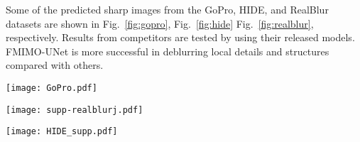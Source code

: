 \documentclass[letterpaper]{article} \usepackage{aaai23}  \usepackage{times}  \usepackage{helvet}  \usepackage{courier}  \usepackage[hyphens]{url}  \usepackage{graphicx} \usepackage{enumitem}
\begin{document}
Some of the predicted sharp images from the GoPro, HIDE, and RealBlur datasets are shown in Fig.~\ref{fig:gopro}, Fig.~\ref{fig:hide} Fig.~\ref{fig:realblur}, respectively. Results from competitors are tested by using their released models. FMIMO-UNet is more successful in deblurring local details and structures compared with others.


\begin{figure*}[h]
\begin{center}
    \texttt{[image: GoPro.pdf]}
\end{center}
\caption{Examples on the GoPro test dataset. The original blur image and the zoom-in patches are shown. From left-top to right-bottom are blurry image, results obtained through, MIMO-UNet+ \cite{Cho2021rethinking}, HINet \cite{Chen2021hinet}, MPRNet \cite{Zamir2021multi}, Restormer \cite{Zamir2021restormer}, FMIMO-UNet, FMIMO-UNet+, and the groundtruth sharp image.} 
\label{fig:gopro}
\vspace{-0.8em}
\end{figure*}

\begin{figure*}[h]
\begin{center}
    \texttt{[image: supp-realblurj.pdf]}
\end{center}
\caption{Examples on RealBlur datasets. The original blur image and the zoom-in patches are shown. From left to right are blurry image, results obtained through DeblurGAN-v2 \cite{Kupyn2019deblurgan}, SRN \cite{Tao2018scale}, FMIMO-UNet+ and the groundtruth sharp image.} 
\label{fig:realblur}
\end{figure*}

\begin{figure*}[h]
\begin{center}
    \texttt{[image: HIDE\_supp.pdf]}
\end{center}
\caption{Examples on HIDE datasets. The original blur image and the zoom-in patches are shown. From left-top to right-bottom are blurry image, results obtained through MIMO-UNet+ \cite{Cho2021rethinking}, HINet \cite{Chen2021hinet}, MPRNet \cite{Zamir2021multi}, Restormer \cite{Zamir2021restormer}, FMIMO-UNet, FMIMO-UNet+ and the groundtruth sharp image.} 
\label{fig:hide}
\end{figure*}
\end{document}
